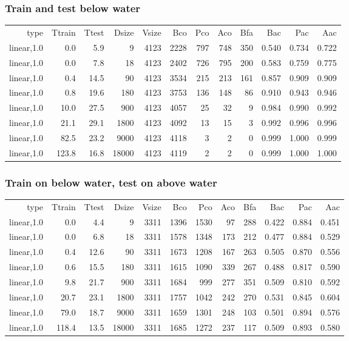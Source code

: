 \subsubsection{Train and test below water}
\begin{longtable}{r|r|r|r|r|r|r|r|r|r|r|r}
    type &  Ttrain &   Ttest & Dsize & Vsize &   Bco &   Pco &   Aco &   Bfa &   Bac &   Pac &   Aac \\
    linear,1.0 &     0.0 &     5.9 &     9 &  4123 &  2228 &   797 &   748 &   350 & 0.540 & 0.734 & 0.722 \\
    linear,1.0 &     0.0 &     7.8 &    18 &  4123 &  2402 &   726 &   795 &   200 & 0.583 & 0.759 & 0.775 \\
    linear,1.0 &     0.4 &    14.5 &    90 &  4123 &  3534 &   215 &   213 &   161 & 0.857 & 0.909 & 0.909 \\
    linear,1.0 &     0.8 &    19.6 &   180 &  4123 &  3753 &   136 &   148 &    86 & 0.910 & 0.943 & 0.946 \\
    linear,1.0 &    10.0 &    27.5 &   900 &  4123 &  4057 &    25 &    32 &     9 & 0.984 & 0.990 & 0.992 \\
    linear,1.0 &    21.1 &    29.1 &  1800 &  4123 &  4092 &    13 &    15 &     3 & 0.992 & 0.996 & 0.996 \\
    linear,1.0 &    82.5 &    23.2 &  9000 &  4123 &  4118 &     3 &     2 &     0 & 0.999 & 1.000 & 0.999 \\
    linear,1.0 &   123.8 &    16.8 & 18000 &  4123 &  4119 &     2 &     2 &     0 & 0.999 & 1.000 & 1.000 \\
\end{longtable}
\ifx\showmixi\undefined
\subsubsection{Train on below water, test on above water}
\begin{longtable}{r|r|r|r|r|r|r|r|r|r|r|r}
          type &  Ttrain &   Ttest & Dsize & Vsize &   Bco &   Pco &   Aco &   Bfa &   Bac &   Pac &   Aac \\
    linear,1.0 &     0.0 &     4.4 &     9 &  3311 &  1396 &  1530 &    97 &   288 & 0.422 & 0.884 & 0.451 \\
    linear,1.0 &     0.0 &     6.8 &    18 &  3311 &  1578 &  1348 &   173 &   212 & 0.477 & 0.884 & 0.529 \\
    linear,1.0 &     0.4 &    12.6 &    90 &  3311 &  1673 &  1208 &   167 &   263 & 0.505 & 0.870 & 0.556 \\
    linear,1.0 &     0.6 &    15.5 &   180 &  3311 &  1615 &  1090 &   339 &   267 & 0.488 & 0.817 & 0.590 \\
    linear,1.0 &     9.8 &    21.7 &   900 &  3311 &  1684 &   999 &   277 &   351 & 0.509 & 0.810 & 0.592 \\
    linear,1.0 &    20.7 &    23.1 &  1800 &  3311 &  1757 &  1042 &   242 &   270 & 0.531 & 0.845 & 0.604 \\
    linear,1.0 &    79.0 &    18.7 &  9000 &  3311 &  1659 &  1301 &   248 &   103 & 0.501 & 0.894 & 0.576 \\
    linear,1.0 &   118.4 &    13.5 & 18000 &  3311 &  1685 &  1272 &   237 &   117 & 0.509 & 0.893 & 0.580 
\end{longtable}
